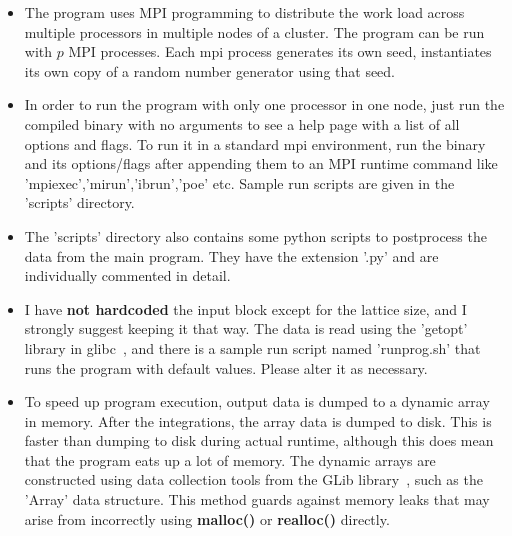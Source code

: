\documentclass[a4paper,10pt]{article}
\begin{document}
\begin{itemize}
\item
 The program uses MPI programming to distribute the work load across multiple processors in multiple nodes of a cluster.  The program can be run with $p$ MPI processes. Each mpi process generates its own seed, instantiates its own copy of a random number generator using that seed.
\item
In order to run the program with only one processor in one node, just run the compiled binary with no arguments to see a help page with a list of all options and flags. To run it in a standard mpi environment, run the binary and its options/flags after appending them to an MPI runtime command like 'mpiexec','mirun','ibrun','poe' etc. Sample run scripts are given in the 'scripts' directory.
\item
The 'scripts' directory also contains some python scripts to postprocess the data from the main program. They have the extension '.py' and are individually commented in detail.
  \item 
  I have \textbf{not hardcoded} the input block except for the lattice size, and I strongly suggest keeping it that way. The data is read using the 'getopt' library in glibc~\cite{getopt}, and there is a sample run script named 'runprog.sh' that runs the program with default values. Please alter it as necessary.
 \item
 To speed up program execution, output data is dumped to a dynamic array in memory. After the integrations, the array data is dumped to disk. This is faster than dumping to disk during actual runtime, although this does mean that the program eats up a lot of memory. The dynamic arrays are constructed using data collection tools from the GLib library~\cite{glib}, such as the 'Array' data structure. This method guards against memory leaks that may arise from incorrectly using \textbf{malloc()} or \textbf{realloc()} directly.
\end{itemize}
\end{document}
